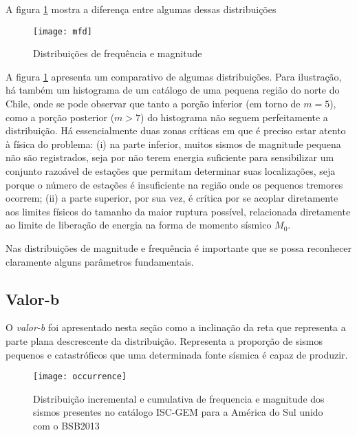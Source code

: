 A figura \ref{f:mfd} mostra a diferença entre algumas dessas distribuições

\begin{figure}[H]
   \centering
   \texttt{[image: mfd]}
   \caption[Distribuições de frequência e magnitude]
   		   {Distribuições de frequência e magnitude} 
   \label{f:mfd}
\end{figure} 

A figura \ref{f:mfd} apresenta um comparativo de algumas distribuições. Para ilustração, há também um histograma de um catálogo de
uma pequena região do norte do Chile, onde se pode observar que tanto a porção inferior (em torno de $m=5$), como a porção
posterior ($m > 7$) do histograma não seguem perfeitamente a distribuição. Há essencialmente duas zonas críticas em que é preciso
estar atento à física do problema:
(i) na parte inferior, muitos sismos de magnitude pequena não são registrados, seja por não terem energia suficiente
para sensibilizar um conjunto razoável de estações que permitam determinar suas localizações, seja porque o número de
estações é insuficiente na região onde os pequenos tremores ocorrem; (ii) a parte superior, por sua vez, é crítica
por se acoplar diretamente aos limites físicos do tamanho da maior ruptura possível, relacionada diretamente ao limite de liberação de energia na forma de momento sísmico $M_0$.

Nas distribuições de magnitude e frequência é importante que se possa reconhecer claramente alguns parâmetros
fundamentais.

\subsection{Valor-b}
\label{sec:b_value}

O \emph{valor-b} foi apresentado nesta seção como a inclinação da reta que representa a parte plana descrescente da
distribuição. Representa a proporção de sismos pequenos e catastróficos que uma determinada fonte sísmica é capaz de
produzir.


\begin{figure}[H]
   \centering
   \texttt{[image: occurrence]}
   \caption[Distribuição incremental e cumulativa de frequencia e magnitude dos sismos presentes no catálogo ISC-GEM
   para a América do Sul unido com o BSB2013]
   {Distribuição incremental e cumulativa de frequencia e magnitude dos sismos presentes no catálogo ISC-GEM
   para a América do Sul unido com o BSB2013} 
   \label{f:occurrence}
\end{figure} 
 




